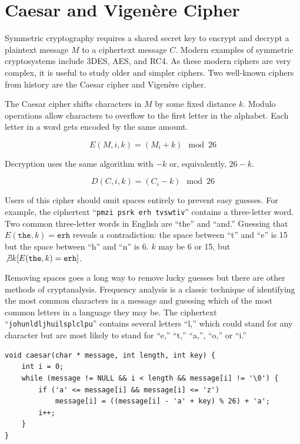 \documentclass{book}
\begin{document}
\chapter{Caesar and Vigen\`ere Cipher}

Symmetric cryptography requires a shared secret key to encrypt and decrypt a plaintext message $M$ to a ciphertext message $C$. Modern examples of symmetric cryptosystems include 3DES, AES, and RC4. As these modern ciphers are very complex, it is useful to study older and simpler ciphers. Two well-known ciphers from history are the Caesar cipher and Vigen\`ere cipher.

The Caesar cipher shifts characters in $M$ by some fixed distance $k$. Modulo operations allow characters to overflow to the first letter in the alphabet. Each letter in a word gets encoded by the same amount.

\begin{equation}
E(M, i, k) = (M_i + k) \mod{26}
\end{equation}

Decryption uses the same algorithm with $-k$ or, equivalently, $26 - k$.

\begin{equation}
D(C, i, k) = (C_i - k) \mod{26}
\end{equation}

Users of this cipher should omit spaces entirely to prevent easy guesses. For example, the ciphertext ``\texttt{pmzi psrk erh tvswtiv}'' contains a three-letter word. Two common three-letter words in English are ``the'' and ``and.'' Guessing that $E(\texttt{the}, k) = \texttt{erh}$ reveals a contradiction: the space between ``t'' and ``e'' is 15 but the space between ``h'' and ``n'' is 6. $k$ may be 6 or 15, but $\not \exists k [E(\texttt{the}, k) = \texttt{erh}]$.

Removing spaces goes a long way to remove lucky guesses but there are other methods of cryptanalysis. Frequency analysis is a classic technique of identifying the most common characters in a message and guessing which of the most common letters in a language they may be. The ciphertext ``\texttt{johunldljhuilsplclpu}'' contains several letters ``l,'' which could stand for any character but are most likely to stand for ``e,'' ``t,'' ``a,'', ``o,'' or ``i.''

\begin{lstlisting}[caption={A C function to encrypt a string using the Caesar cipher},captionpos=b]
void caesar(char * message, int length, int key) {
    int i = 0;
    while (message != NULL && i < length && message[i] != '\0') {
        if ('a' <= message[i] && message[i] <= 'z')
            message[i] = ((message[i] - 'a' + key) % 26) + 'a';
        i++;
    }
}
\end{lstlisting}
\end{document}
